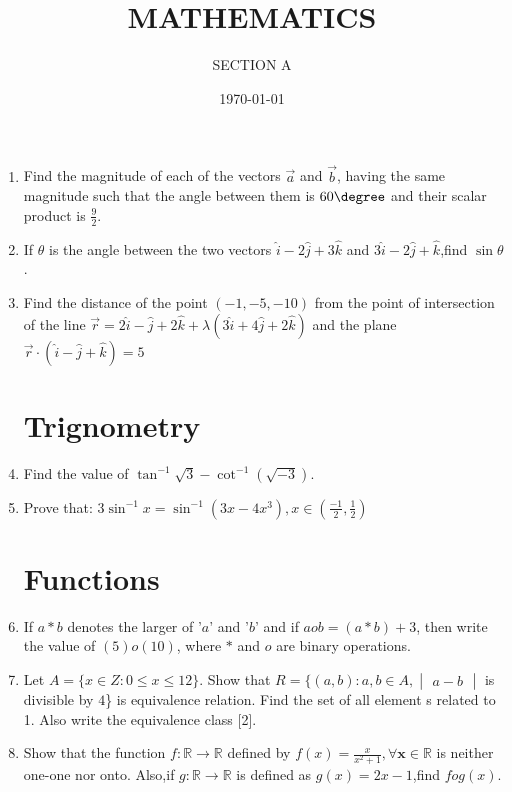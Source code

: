 \documentclass[10pt,-letter paper]{article}
\title{MATHEMATICS}
\author{SECTION A}
\date{\today}
\providecommand{\brak}[1]{\ensuremath{\left(#1\right)}}
\newcommand{\mydet}[1]{\ensuremath{\begin{vmatrix}#1\end{vmatrix}}}
\begin{document}
\maketitle

\begin{enumerate}
\section{Vector Algebra}
\item Find the magnitude of each of the vectors $\overrightarrow{a}$ and $\overrightarrow{b}$, having the same magnitude such that the angle between them is ${60\degree}$ and their scalar product is $\frac{9}{2}$.
\item If $\theta$ is the angle between the two vectors $\hat{i}-2\hat{j}+3\hat{k}$ and $3\hat{i}-2\hat{j}+\hat{k}$,find $\sin\theta$.
\item  Find the distance of the point \brak{-1,-5,-10} from the point of intersection of the line $\overrightarrow{r}=2\hat{i}-\hat{j}+2\hat{k}+\lambda\brak{3\hat{i}+4\hat{j}+2\hat{k}}$ and the plane $\overrightarrow{r}\cdot\brak{\hat{i}-\hat{j}+\hat{k}}=5$




\section{Trignometry}
\item Find the value of $\tan^{-1}\sqrt{3}-\cot^{-1}\brak{\sqrt{-3}}$.
\item Prove that:                                         $3\sin^{-1}x=\sin^{-1}\brak{3x-4x^3}, x\in\brak{\frac{-1}{2},\frac{1}{2}}$
                    


\section{Functions}
\item  If $a*b$ denotes the larger of '$a$' and '$b$' and if $a o b = \brak{a * b} + 3$, then write the value of $\brak{5} o \brak{10}$, where $*$ and $o$ are binary operations.
\item   Let $A=\{x \in Z : 0 \leq x \leq 12\}$. Show that  $R=\{\brak{a,b}: a,b \in A,\mydet{a-b}$ is divisible by $ 4$\} is equivalence relation. Find the set of all element s related to 1. Also write the equivalence class [2].    
\item Show that the function $f:\mathbb{R}\rightarrow \mathbb{R}$ defined by $f\brak{x} = \frac{x}{x^{2}+1}, \forall\mathbf{x}\in \mathbb{R}$ is neither one-one nor onto. Also,if $g:\mathbb{R} \rightarrow \mathbb{R}$ is defined as $g\brak{x}=2x-1$,find $fog\brak{x}$.




\end{enumerate}
\end{document}

